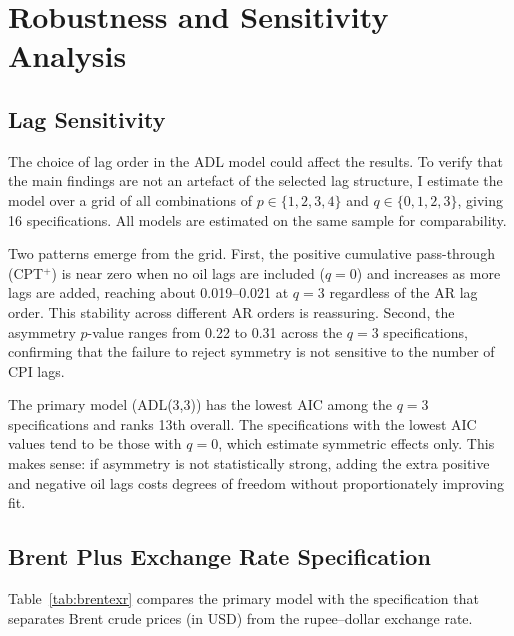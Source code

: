 \chapter{Robustness and Sensitivity Analysis}
\label{ch:robustness}

\section{Lag Sensitivity}

The choice of lag order in the ADL model could affect the results. To verify that the main findings are not an artefact of the selected lag structure, I estimate the model over a grid of all combinations of $p \in \{1, 2, 3, 4\}$ and $q \in \{0, 1, 2, 3\}$, giving 16 specifications. All models are estimated on the same sample for comparability.

Two patterns emerge from the grid. First, the positive cumulative pass-through (CPT$^+$) is near zero when no oil lags are included ($q = 0$) and increases as more lags are added, reaching about 0.019--0.021 at $q = 3$ regardless of the AR lag order. This stability across different AR orders is reassuring. Second, the asymmetry $p$-value ranges from 0.22 to 0.31 across the $q = 3$ specifications, confirming that the failure to reject symmetry is not sensitive to the number of CPI lags.

The primary model (ADL(3,3)) has the lowest AIC among the $q = 3$ specifications and ranks 13th overall. The specifications with the lowest AIC values tend to be those with $q = 0$, which estimate symmetric effects only. This makes sense: if asymmetry is not statistically strong, adding the extra positive and negative oil lags costs degrees of freedom without proportionately improving fit.

\section{Brent Plus Exchange Rate Specification}

Table~\ref{tab:brentexr} compares the primary model with the specification that separates Brent crude prices (in USD) from the rupee--dollar exchange rate.

